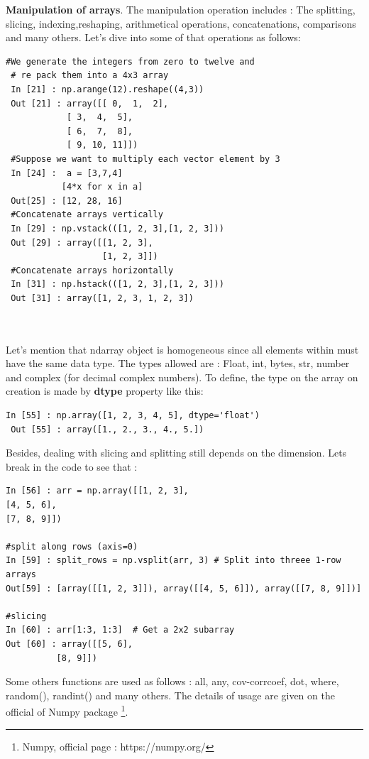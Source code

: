 \documentclass[12pt,a4paper, oneside]{book}
\begin{document}
 \noindent\textbf{Manipulation of arrays}. The manipulation operation includes : The splitting, slicing, indexing,reshaping, arithmetical operations, concatenations, comparisons and many others. Let's dive into some of that operations as follows:
 \begin{lstlisting}[style=stylejupyter] 
 #We generate the integers from zero to twelve and
 # re pack them into a 4x3 array
 In [21] : np.arange(12).reshape((4,3))  
 Out [21] : array([[ 0,  1,  2],
 		    [ 3,  4,  5],
 		    [ 6,  7,  8],
 		    [ 9, 10, 11]]) 
 #Suppose we want to multiply each vector element by 3
 In [24] :  a = [3,7,4] 
           [4*x for x in a]
 Out[25] : [12, 28, 16]  
 #Concatenate arrays vertically  
 In [29] : np.vstack(([1, 2, 3],[1, 2, 3]))  
 Out [29] : array([[1, 2, 3],
                   [1, 2, 3]]) 
 #Concatenate arrays horizontally
 In [31] : np.hstack(([1, 2, 3],[1, 2, 3]))
 Out [31] : array([1, 2, 3, 1, 2, 3])   
 
 
 \end{lstlisting} 
 Let's mention that ndarray object is homogeneous since all elements within must have the same data type. The types allowed are : Float, int, bytes, str, number and complex (for decimal complex numbers). To define, the type on the array on creation is made by \textbf{dtype} property like this: 
\begin{lstlisting}[style=stylejupyter] 
 In [55] : np.array([1, 2, 3, 4, 5], dtype='float') 
 Out [55] : array([1., 2., 3., 4., 5.]) 
\end{lstlisting} 

Besides, dealing with slicing and splitting still depends on the dimension. Lets break in the code to see that : 
\begin{lstlisting}[style=stylejupyter]
In [56] : arr = np.array([[1, 2, 3],
[4, 5, 6],
[7, 8, 9]]) 

#split along rows (axis=0)
In [59] : split_rows = np.vsplit(arr, 3) # Split into threee 1-row arrays
Out[59] : [array([[1, 2, 3]]), array([[4, 5, 6]]), array([[7, 8, 9]])]

#slicing 
In [60] : arr[1:3, 1:3]  # Get a 2x2 subarray
Out [60] : array([[5, 6],
		  [8, 9]])
\end{lstlisting}   
 Some others functions are used as follows : all, any, cov-corrcoef, dot, where, random(), randint() and many others. The details of usage are given on the official of Numpy package \footnote{Numpy, official page : https://numpy.org/}.
\\
\end{document}
